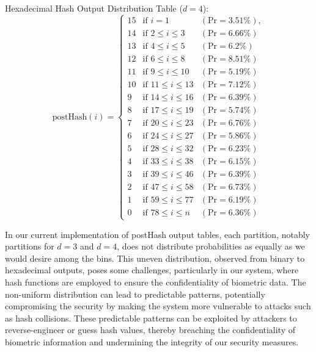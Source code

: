 Hexadecimal Hash Output Distribution Table (\(d=4\)):
{
\renewcommand{\arraystretch}{1.25}
\[
\text{postHash}(i) = \left\{
\begin{array}{lll}
    \text{15} & \text{if } i = 1 & (\text{Pr} = 3.51\%), \\
    \text{14} & \text{if } 2 \leq i \leq 3 & (\text{Pr} = 6.66\%) \\
    \text{13} & \text{if } 4 \leq i \leq 5 & (\text{Pr} = 6.2\%) \\
    \text{12} & \text{if } 6 \leq i \leq 8 & (\text{Pr} = 8.51\%) 
    \\
    \text{11} & \text{if } 9 \leq i \leq 10 & (\text{Pr} = 5.19\%) \\
    \text{10} & \text{if } 11 \leq i \leq 13 & (\text{Pr} = 7.12\%) \\
    \text{9} & \text{if } 14 \leq i \leq 16 & (\text{Pr} = 6.39\%) \\
    \text{8} & \text{if } 17 \leq i \leq 19 & (\text{Pr} = 5.74\%) \\
    \text{7} & \text{if } 20 \leq i \leq 23 & (\text{Pr} = 6.76\%) \\
    \text{6} & \text{if } 24 \leq i \leq 27 & (\text{Pr} = 5.86\%) \\
    \text{5} & \text{if } 28 \leq i \leq 32 & (\text{Pr} = 6.23\%) \\
    \text{4} & \text{if } 33 \leq i \leq 38 & (\text{Pr} = 6.15\%) \\
    \text{3} & \text{if } 39 \leq i \leq 46 & (\text{Pr} = 6.39\%) \\
    \text{2} & \text{if } 47 \leq i \leq 58 & (\text{Pr} = 6.73\%) \\
    \text{1} & \text{if } 59 \leq i \leq 77 & (\text{Pr} = 6.19\%) \\
    \text{0} & \text{if } 78 \leq i \leq n & (\text{Pr} = 6.36\%)
\end{array}
\right.
\]
}

In our current implementation of postHash output tables, each partition, notably partitions for \(d = 3\) and \(d = 4\), does not distribute probabilities as equally as we would desire among the bins. This uneven distribution, observed from binary to hexadecimal outputs, poses some challenges, particularly in our system, where hash functions are employed to ensure the confidentiality of biometric data. The non-uniform distribution can lead to predictable patterns, potentially compromising the security by making the system more vulnerable to attacks such as hash collisions. These predictable patterns can be exploited by attackers to reverse-engineer or guess hash values, thereby breaching the confidentiality of biometric information and undermining the integrity of our security measures.

